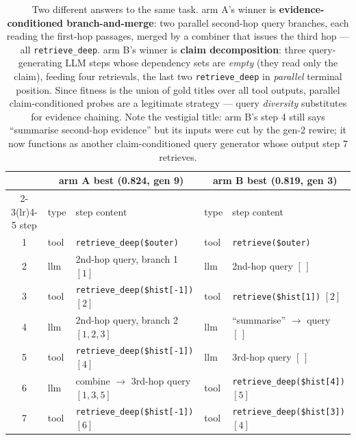 \documentclass[11pt]{article}
\newcommand{\armA}{\textcolor{bad}{arm A}}
\newcommand{\armB}{\textcolor{accent}{arm B}}
\begin{document}
\begin{table}[H]\centering\footnotesize
\begin{tabular}{cllll}
\toprule
 & \multicolumn{2}{c}{\armA{} best (0.824, gen 9)} & \multicolumn{2}{c}{\armB{} best (0.819, gen 3)} \\
\cmidrule(lr){2-3}\cmidrule(lr){4-5}
step & type & step content & type & step content \\
\midrule
1 & \textcolor{accent}{tool} & \texttt{retrieve\_deep(\$outer)} & \textcolor{accent}{tool} & \texttt{retrieve(\$outer)} \\
2 & \textcolor{bad!70!black}{llm} & 2nd-hop query, branch 1 \hfill $[1]$ & \textcolor{bad!70!black}{llm} & 2nd-hop query \hfill $[\,]$ \\
3 & \textcolor{accent}{tool} & \texttt{retrieve\_deep(\$hist[-1])} \hfill $[2]$ & \textcolor{accent}{tool} & \texttt{retrieve(\$hist[1])} \hfill $[2]$ \\
4 & \textcolor{bad!70!black}{llm} & 2nd-hop query, branch 2 \hfill $[1,2,3]$ & \textcolor{bad!70!black}{llm} & ``summarise'' $\to$ query \hfill $[\,]$ \\
5 & \textcolor{accent}{tool} & \texttt{retrieve\_deep(\$hist[-1])} \hfill $[4]$ & \textcolor{bad!70!black}{llm} & 3rd-hop query \hfill $[\,]$ \\
6 & \textcolor{bad!70!black}{llm} & combine $\to$ 3rd-hop query \hfill $[1,3,5]$ & \textcolor{accent}{tool} & \texttt{retrieve\_deep(\$hist[4])} \hfill $[5]$ \\
7 & \textcolor{accent}{tool} & \texttt{retrieve\_deep(\$hist[-1])} \hfill $[6]$ & \textcolor{accent}{tool} & \texttt{retrieve\_deep(\$hist[3])} \hfill $[4]$ \\
\bottomrule
\end{tabular}
\caption{Two different answers to the same task. \armA's winner is \textbf{evidence-conditioned
branch-and-merge}: two parallel second-hop query branches, each reading the first-hop passages,
merged by a combiner that issues the third hop --- all \texttt{retrieve\_deep}. \armB's winner is
\textbf{claim decomposition}: three query-generating LLM steps whose dependency sets are
\emph{empty} (they read only the claim), feeding four retrievals, the last two
\texttt{retrieve\_deep} in \emph{parallel} terminal position. Since fitness is the union of gold
titles over all tool outputs, parallel claim-conditioned probes are a legitimate strategy ---
query \emph{diversity} substitutes for evidence chaining. Note the vestigial title: \armB's step
4 still says ``summarise second-hop evidence'' but its inputs were cut by the gen-2 rewire; it
now functions as another claim-conditioned query generator whose output step 7 retrieves.}
\end{table}
\end{document}
